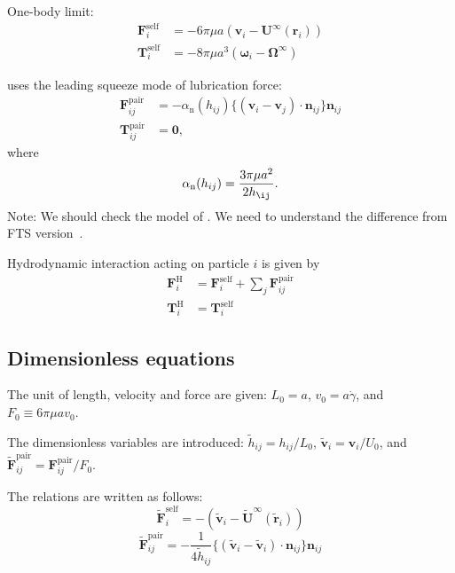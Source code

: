 \documentclass[12pt]{article}
\begin{document}
One-body limit:
\begin{align}
 \bm{F}_i^{\mathrm{self}} &= 
-6 \pi \mu a ( \bm{v}_i - \bm{U}^{\infty} (\bm{r}_i) ) \\
 \bm{T}_i^{\mathrm{self}} &= 
-8 \pi \mu a^3 ( \bm{\omega}_i - \bm{\Omega}^{\infty})
\end{align}

\citet{Melrose_2004a} uses 
the leading squeeze mode of lubrication force:
\begin{align}
 \bm{F}_{ij}^{\mathrm{pair}}
&=
- \alpha_{\mathrm{n}}(h_{ij})
\bigl\{
(\bm{v}_i - \bm{v}_j)
\cdot \bm{n}_{ij}
\bigr\}
\bm{n}_{ij} \\
 \bm{T}_{ij}^{\mathrm{pair}}
&=
\bm{0},
\end{align}
where
\begin{equation}
 \alpha_{\mathrm{n}}(h_{ij}) = 
\frac{3 \pi \mu a^2}{2 h_{\ij}}.
\end{equation}
Note: We should check the model of \citet{Ball_1997,Melrose_2004a}.
%
We need to understand the difference from FTS version~\citet{Jeffrey_1992}.


Hydrodynamic interaction acting on particle $i$
is given by
\begin{align}
\bm{F}_i^{\mathrm{H}}
&=
\bm{F}_i^{\mathrm{self}}
+
\sum_j
\bm{F}_{ij}^{\mathrm{pair}} \\
\bm{T}_i^{\mathrm{H}}
&=
\bm{T}_i^{\mathrm{self}}
\end{align}


\subsection*{Dimensionless equations}

The unit of length, velocity and force 
are given:
$L_0 = a$,  $v_0 = a \dot{\gamma}$, and $F_0 \equiv 6 \pi \mu a v_0$.

The dimensionless variables are introduced:
$\tilde{h}_{ij} = h_{ij} / L_0$,
$\tilde{\bm{v}}_i = \bm{v}_i / U_0$,
and $\tilde{\bm{F}}_{ij}^{\mathrm{pair}} = \bm{F}_{ij}^{\mathrm{pair}} / F_0$.

The relations are written as follows:
\begin{equation}
 \tilde{\bm{F}}_i^{\mathrm{self}} = 
-( \tilde{\bm{v}}_i - 
\tilde{\bm{U}}^{\infty} 
(\tilde{\bm{r}}_i) )
\end{equation}
\begin{equation}
 \tilde{\bm{F}}_{ij}^{\mathrm{pair}}
= 
- \frac{1}{4 \tilde{h}_{ij}}
\bigl\{
(\tilde{\bm{v}}_i-
\tilde{\bm{v}}_i)\cdot
\bm{n}_{ij}
\bigr\}\bm{n}_{ij}
\end{equation}
\end{document}
